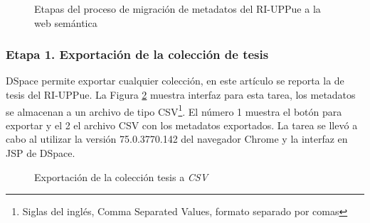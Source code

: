 \begin{figure}[!ht]
	\centering
    \caption{Etapas del proceso de migraci\'on de metadatos del RI-UPPue a la web sem\'antica} %
    \label{etapasMigracion}
\end{figure}

\subsubsection{Etapa 1. Exportaci\'on de la colecci\'on de tesis}

DSpace permite exportar cualquier colecci\'on, en este art\'iculo se reporta la de tesis del RI-UPPue. La Figura \ref{exportacion-csv} muestra interfaz para esta tarea, los metadatos se almacenan a un archivo de tipo CSV\footnote{Siglas del ingl\'es, Comma Separated Values, formato separado por comas}. El n\'umero 1 muestra el bot\'on para exportar y el 2 el archivo CSV con los metadatos exportados. La tarea se llev\'o a cabo al utilizar la versi\'on 75.0.3770.142 del navegador Chrome y la interfaz en JSP de DSpace.

\begin{figure}[!ht]
	\centering
    \caption{Exportaci\'on de la colecci\'on tesis a \textit{CSV}}
    \label{exportacion-csv}
\end{figure}


